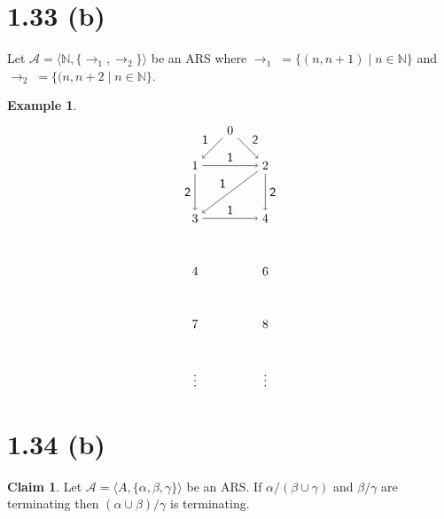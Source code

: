 \documentclass[autodetect-enginem]{article}
\theoremstyle{plain}
\theoremstyle{definition}
\newtheorem*{example}{Example}
\newtheorem*{claim*}{Claim}
\begin{document}
\section*{1.33 (b)}


Let $\mathcal{A} = \langle \mathbb{N}, \{\to_1, \to_2\} \rangle$ be an ARS
    where $\to_1\; = \{(n, n+1) \mid n \in \mathbb{N}\}$ and $\to_2 \;= \{(n, n+2 \mid n \in \mathbb{N}\}$.

\begin{example}
    \[
    \begin{tikzpicture}[auto]
        \node (0) at (0,0) {$0$};
        \node (1) at (-1,-1) {$1$}; \node (2) at (1,-1) {$2$};
        \node (3) at (-1,-2.5) {$3$}; \node (4) at (1,-2.5) {$4$};
        \node (5) at (-1,-4) {$4$}; \node (6) at (1,-4) {$6$};
        \node (7) at (-1,-5.5) {$7$}; \node (8) at (1,-5.5) {$8$};
        \node (vd1) at (-1,-7) {$\vdots$}; \node (vd2) at (1, -7) {$\vdots$};
        
        \draw[->] (0) to node[swap]{$\mathsf{1}$} (1);
        \draw[->] (0) to node[]{$\mathsf{2}$} (2);
        \draw[->] (1) to node[swap]{$\mathsf{2}$} (3);
        \draw[->] (1) to node{$\mathsf{1}$} (2);
        \draw[->] (2) to node{$\mathsf{2}$} (4);
        \draw[->] (2) to node[swap]{$\mathsf{1}$} (3);
        \draw[->] (3) to node{$\mathsf{1}$} (4);
    \end{tikzpicture}
    \]
\end{example}

\section*{1.34 (b)}

\begin{claim*}
    Let $\mathcal{A} = \langle A, \{\alpha, \beta, \gamma\} \rangle$ be an ARS.
    If $\alpha/(\beta \cup \gamma)$ and $\beta/\gamma$ are terminating
    then $(\alpha \cup \beta) / \gamma$ is terminating.
\end{claim*}
\end{document}
